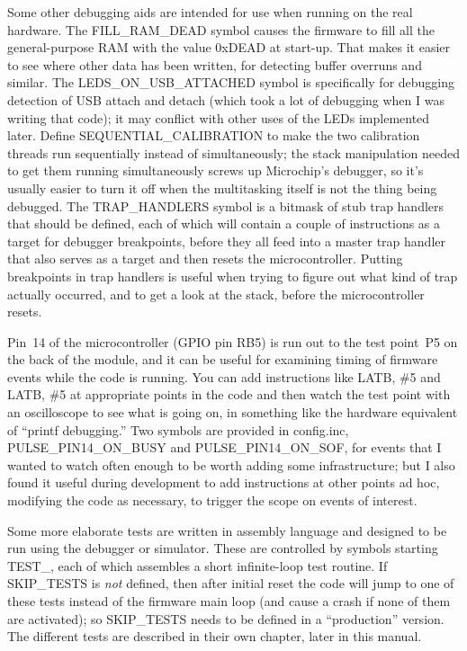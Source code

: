 Some other debugging aids are intended for use when running on the real
hardware.  The FILL\_RAM\_DEAD symbol causes the firmware to fill all the
general-purpose RAM with the value 0xDEAD at start-up.  That makes it easier
to see where other data has been written, for detecting buffer overruns and
similar.  The LEDS\_ON\_USB\_ATTACHED symbol is specifically for debugging
detection of USB attach and detach (which took a lot of debugging when I was
writing that code); it may conflict with other uses of the LEDs implemented
later.  Define SEQUENTIAL\_CALIBRATION to make the two calibration threads
run sequentially instead of simultaneously; the stack manipulation needed to
get them running simultaneously screws up Microchip's debugger, so it's
usually easier to turn it off when the multitasking itself is not the thing
being debugged.  The TRAP\_HANDLERS symbol is a bitmask of stub trap
handlers that should be defined, each of which will contain a couple of
 instructions as a target for debugger breakpoints, before they
all feed into a master trap handler that also serves as a target and then
resets the microcontroller.  Putting breakpoints in trap handlers is useful
when trying to figure out what kind of trap actually occurred, and to get a
look at the stack, before the microcontroller resets.

Pin~14 of the microcontroller (GPIO pin RB5) is run out to the test point~P5
on the back of the module, and it can be useful for examining timing of
firmware events while the code is running.  You can add instructions like
 LATB, \#5 and  LATB, \#5 at appropriate points in the
code and then watch the test point with an oscilloscope to see what is going
on, in something like the hardware equivalent of ``printf debugging.'' Two
symbols are provided in config.inc, PULSE\_PIN14\_ON\_BUSY and
PULSE\_PIN14\_ON\_SOF, for events that I wanted to watch often enough to be
worth adding some infrastructure; but I also found it useful during
development to add instructions at other points ad hoc, modifying the code
as necessary, to trigger the scope on events of interest.

Some more elaborate tests are written in assembly language and designed to
be run using the debugger or simulator.  These are controlled by symbols
starting TEST\_, each of which assembles a short infinite-loop test routine. 
If SKIP\_TESTS is \emph{not} defined, then after initial reset the code will
jump to one of these tests instead of the firmware main loop (and cause a
crash if none of them are activated); so SKIP\_TESTS needs to be defined in
a ``production'' version.  The different tests are described in their own
chapter, later in this manual.

